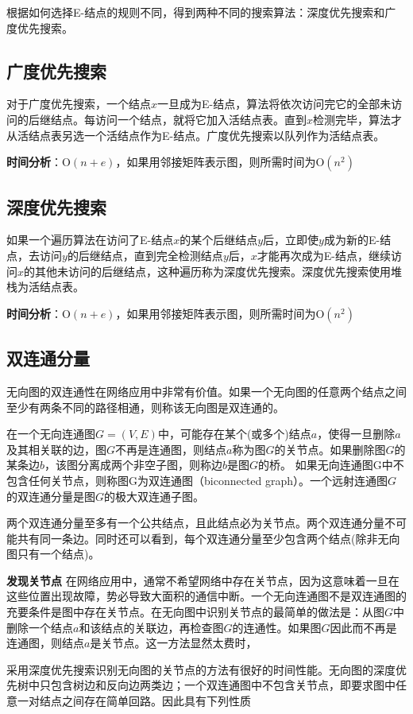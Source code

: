 根据如何选择E-结点的规则不同，得到两种不同的搜索算法：深度优先搜索和广度优先搜索。
\subsection*{广度优先搜索}
对于广度优先搜索，一个结点$x$一旦成为E-结点，算法将依次访问完它的全部未访问的后继结点。每访问一个结点，就将它加入活结点表。直到$x$检测完毕，算法才从活结点表另选一个活结点作为E-结点。广度优先搜索以队列作为活结点表。

\textbf{时间分析}：$\mathrm{O}(n+e)$，如果用邻接矩阵表示图，则所需时间为$\mathrm{O}(n^2)$
\subsection*{深度优先搜索}
如果一个遍历算法在访问了E-结点$x$的某个后继结点$y$后，立即使$y$成为新的E-结点，去访问$y$的后继结点，直到完全检测结点$y$后，$x$才能再次成为E-结点，继续访问$x$的其他未访问的后继结点，这种遍历称为深度优先搜索。深度优先搜索使用堆栈为活结点表。

\textbf{时间分析}：$\mathrm{O}(n+e)$，如果用邻接矩阵表示图，则所需时间为$\mathrm{O}(n^2)$
\subsection*{双连通分量}
无向图的双连通性在网络应用中非常有价值。如果一个无向图的任意两个结点之间至少有两条不同的路径相通，则称该无向图是双连通的。

在一个无向连通图$G=(V,E)$中，可能存在某个(或多个)结点$a$，使得一旦删除$a$及其相关联的边，图$G$不再是连通图，则结点$a$称为图$G$的关节点。如果删除图$G$的某条边$b$，该图分离成两个非空子图，则称边$b$是图$G$的桥。
如果无向连通图G中不包含任何关节点，则称图G为双连通图（biconnected graph）。一个远射连通图$G$的双连通分量是图$G$的极大双连通子图。

两个双连通分量至多有一个公共结点，且此结点必为关节点。两个双连通分量不可能共有同一条边。同时还可以看到，每个双连通分量至少包含两个结点(除非无向图只有一个结点)。

\textbf{发现关节点}
在网络应用中，通常不希望网络中存在关节点，因为这意味着一旦在这些位置出现故障，势必导致大面积的通信中断。一个无向连通图不是双连通图的充要条件是图中存在关节点。在无向图中识别关节点的最简单的做法是：从图$G$中删除一个结点$a$和该结点的关联边，再检查图$G$的连通性。如果图$G$因此而不再是连通图，则结点$a$是关节点。这一方法显然太费时，

采用深度优先搜索识别无向图的关节点的方法有很好的时间性能。无向图的深度优先树中只包含树边和反向边两类边；一个双连通图中不包含关节点，即要求图中任意一对结点之间存在简单回路。因此具有下列性质 

